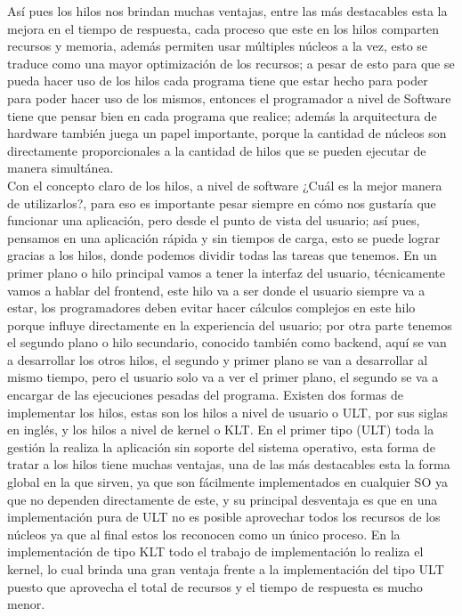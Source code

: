 \documentclass{article}
\begin{document}
Así pues los hilos nos brindan muchas ventajas, entre las más destacables esta la mejora en el tiempo de respuesta, cada proceso que este en los hilos comparten recursos y memoria, además permiten usar múltiples núcleos a la vez, esto se traduce como una mayor optimización de los recursos; a pesar de esto para que se pueda hacer uso de los hilos cada programa tiene que estar hecho para poder para poder hacer uso de los mismos, entonces el programador a nivel de Software tiene que pensar bien en cada programa que realice; además la arquitectura de hardware también juega un papel importante, porque la cantidad de núcleos son directamente proporcionales a la cantidad de hilos que se pueden ejecutar de manera simultánea.\\

Con el concepto claro de los hilos, a nivel de software ¿Cuál es la mejor manera de utilizarlos?, para eso es importante pesar siempre en cómo nos gustaría que funcionar una aplicación, pero desde el punto de vista del usuario; así pues, pensamos en una aplicación rápida y sin tiempos de carga, esto se puede lograr gracias a los hilos, donde podemos dividir todas las tareas que tenemos. En un primer plano o hilo principal vamos a tener la interfaz del usuario, técnicamente vamos a hablar del frontend, este hilo va a ser donde el usuario siempre va a estar, los programadores deben evitar hacer cálculos complejos en este hilo porque influye directamente en la experiencia del usuario; por otra parte tenemos el segundo plano o hilo secundario, conocido también como backend, aquí se van a desarrollar los otros hilos, el segundo y primer plano se van a desarrollar al mismo tiempo, pero el usuario solo va a ver el primer plano, el segundo se va a encargar de las ejecuciones pesadas del programa.
Existen dos formas de implementar los hilos, estas son los hilos a nivel de usuario o ULT, por sus siglas en inglés, y los hilos a nivel de kernel o KLT. En el primer tipo (ULT) toda la gestión la realiza la aplicación sin soporte del sistema operativo, esta forma de tratar a los hilos tiene muchas ventajas, una de las más destacables esta la forma global en la que sirven, ya que son fácilmente implementados en cualquier SO ya que no dependen directamente de este, y su principal desventaja es que en una implementación pura de ULT no es posible aprovechar todos los recursos de los núcleos ya que al final estos los reconocen como un único proceso. En la implementación de tipo KLT todo el trabajo de implementación lo realiza el kernel, lo cual brinda una gran ventaja frente a la implementación del tipo ULT puesto que aprovecha el total de recursos y el tiempo de respuesta es mucho menor.\\
\end{document}
